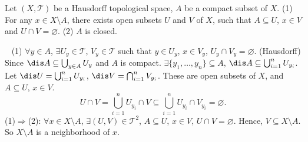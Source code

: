 \begin{propositionenv}\label{8.8.10}
    Let $(X,\mathscr{T})$ be a Hausdorff topological space, $A$ be a compact subset of $X$. 
    \newline
    (1) For any $x\in X\setminus A$, there exists open subsets $U$ and $V$ of $X$, such that $A\subseteq U$, $x\in V$ and $U\cap V=\varnothing$.
    \newline
    (2) $A$ is closed.
\end{propositionenv}
\begin{proofenv}
    \ \newline
    (1) $\forall y\in A$, $\exists U_y\in \mathscr{T}$, $V_y\in \mathscr{T}$ such that $y\in U_y$, $x\in V_y$, $U_y\cap V_y=\varnothing$. (Hausdorff) Since $\dis A\subseteq \bigcup_{y\in A}U_y$ and $A$ is compact. $\exists \{y_1,\ldots,y_n\}\subseteq A$, $\dis A\subseteq \bigcup_{i=1}^{n}U_{y_i}$. Let $\dis U=\bigcup_{i=1}^n U_{y_i}$, $\dis V=\bigcap_{i=1}^{n}V_{y_i}$. These are open subsets of $X$, and $A\subseteq U$, $x\in V$. 
    $$U\cap V=\bigcup_{i=1}^n U_{y_i}\cap V\subseteq \bigcup_{i=1}^n U_{y_i}\cap V_{y_i}=\varnothing.$$
    (1)$\Rightarrow$(2): $\forall x\in X\setminus A$, $\exists (U,V)\in \mathscr{T}^2$, $A\subseteq U$, $x\in V$, $U\cap V=\varnothing$. Hence, $V\subseteq X\setminus A$. So $X\setminus A$ is a neighborhood of $x$.
    \begin{figure}[H]
        \centering



\begin{tikzpicture}[x=0.75pt,y=0.75pt,yscale=-0.75,xscale=0.75]


\end{tikzpicture}
\end{figure}
\end{proofenv}
